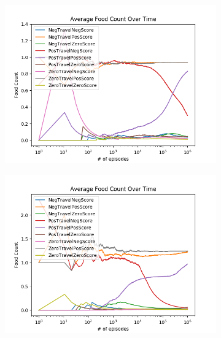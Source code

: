 \documentclass[result.tex]{subfiles}
\begin{document}
    \begin{figure}[ht]
        \centering
        \begin{subfigure}[b]{.35\linewidth}
            \includegraphics[width=\linewidth]{../images/expected_sarsa/reward/234/board_state_average_food_count_over_time.png}
        \end{subfigure}
        \begin{subfigure}[b]{.35\linewidth}
            \includegraphics[width=\linewidth]{../images/expected_sarsa/reward/234/directional_distance_state_average_food_count_over_time.png}
        \end{subfigure}


\end{figure}
\end{document}
